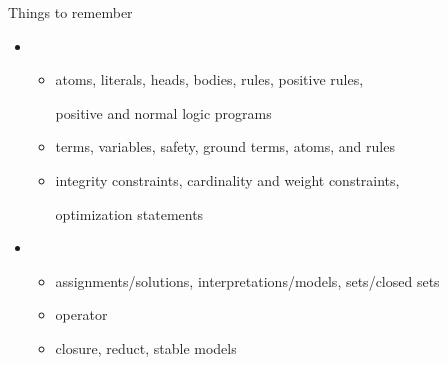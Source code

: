 \begin{frame}{Things to remember}
  \medskip
  \begin{itemize}
  \item {}
    \begin{itemize}\normalsize
    \item atoms, literals, heads, bodies, rules, positive rules,

      positive and normal \alert{logic programs}
      \smallskip
    \item terms, variables, safety, ground terms, atoms, and rules
      \smallskip
    \item integrity constraints, cardinality and weight constraints,

      optimization statements
    \end{itemize}
  \bigskip
  \item {}
    \begin{itemize}\normalsize
    \item assignments/solutions, interpretations/models, sets/closed sets
      \smallskip
    \item {} operator
      \smallskip
    \item closure, reduct, \alert{stable models}
    \end{itemize}
  \end{itemize}
\end{frame}
%
